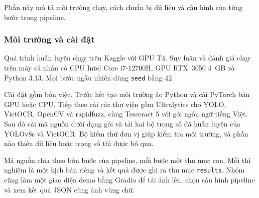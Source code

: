 Phần này mô tả môi trường chạy, cách chuẩn bị dữ liệu và cấu hình của từng bước trong pipeline.

\subsubsection{Môi trường và cài đặt}
Quá trình huấn luyện chạy trên Kaggle với GPU T4.
Suy luận và đánh giá chạy trên máy cá nhân có CPU Intel Core i7-12700H, GPU RTX~3050 4~GB và Python 3.13.
Mọi bước ngẫu nhiên dùng \texttt{seed} bằng 42.

Cài đặt gồm bốn việc.
Trước hết tạo môi trường ảo Python và cài PyTorch bản GPU hoặc CPU.
Tiếp theo cài các thư viện gồm Ultralytics cho YOLO, VietOCR, OpenCV và rapidfuzz, cùng Tesseract 5 với gói ngôn ngữ tiếng Việt.
Sau đó cài mã nguồn dưới dạng gói và tải hai bộ trọng số đã huấn luyện của YOLOv8s và VietOCR.
Bộ kiểm thử đơn vị giúp kiểm tra môi trường, và phần nào thiếu dữ liệu hoặc trọng số thì được bỏ qua.

Mã nguồn chia theo bốn bước của pipeline, mỗi bước một thư mục con.
Mỗi thí nghiệm là một kịch bản riêng và kết quả được ghi ra thư mục \texttt{results}.
Nhóm cũng làm một giao diện demo bằng Gradio để tải ảnh lên, chọn cấu hình pipeline và xem kết quả JSON cùng ảnh vùng chữ.
